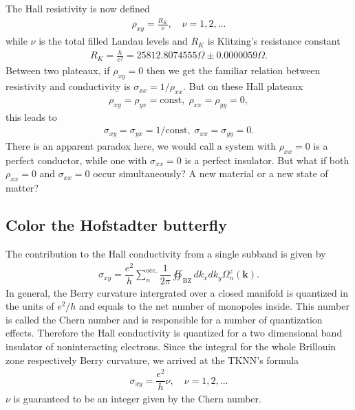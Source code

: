 \documentclass{report}
\newcommand{\dps}{\displaystyle}
\newcommand{\f}[2]{\dfrac{#1}{#2}}
\begin{document}
The Hall resistivity is now defined
\begin{gather}
	\rho_{xy} = \frac{R_{K}}{\nu}, \quad \nu = 1,2,...
\end{gather}
while $\nu$ is the total filled Landau levels and $R_{K}$ is Klitzing's resistance constant
\begin{gather}
	R_{K} = \frac{h}{e^{2}} = 25812.8074555 \Omega \pm 0.0000059 \Omega.
\end{gather}
Between two plateaux, if $\rho_{xy}  = 0$ then we get the familiar relation between resistivity and conductivity is $\sigma_{xx} = 1/\rho_{xx}$. But on these Hall plateaux
\begin{gather}
	\rho_{xy} = \rho_{yx} = \text{const} ,\; \rho_{xx} = \rho_{yy} = 0 ,
\end{gather}
this leads to
\begin{gather}
	\sigma_{xy} = \sigma_{yx} = 1 / \text{const} , \; \sigma_{xx} = \sigma_{yy} = 0.
\end{gather}
There is an apparent paradox here, we would call a system with $\rho_{xx} = 0$ is a perfect conductor, while one with $\sigma_{xx} = 0$ is a perfect insulator. But what if both $\rho_{xx} = 0$ and $\sigma_{xx} = 0$ occur simultaneously? A new material or a new state of matter?


\subsection{Color the Hofstadter butterfly}
The contribution to the Hall conductivity from a single subband is given by \cite{kohmoto1989,hatsugai1990energy,kohmoto1985topological,thouless1982}
\begin{gather}
	\sigma_{xy} = \f{e^{2}}{h} \sum_{n}^{\text{occ.}} \f{1}{2\pi} \dps\oiint_{\text{{BZ}}} d k_{x} d k_{y} \Omega_{n}^{z} (\mathbf{k}).
\end{gather}
In general, the Berry curvature intergrated over a closed manifold is quantized in the units of $e^{2} / h$ and equals to the net number of monopoles inside. This number is called the Chern number and is responsible for a number of quantization effects. Therefore the Hall conductivity is quantized for a two dimensional band insulator of noninteracting electrons. Since the integral for the whole Brillouin zone respectively Berry curvature, we arrived at the \ac{TKNN}'s formula \cite{thouless1982}
\begin{gather}
	\sigma_{xy} = \f{e^{2}}{h} \nu, \quad \nu = 1,2,...
\end{gather}
$\nu$ is guaranteed to be an integer given by the Chern number.
\end{document}
